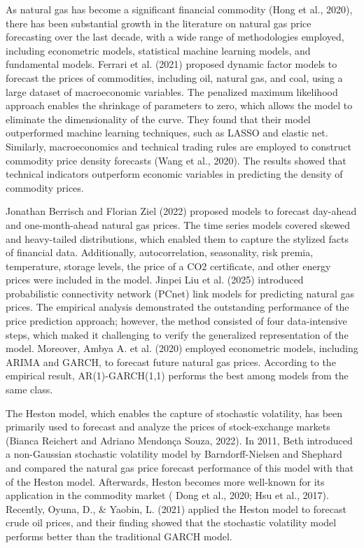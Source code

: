 \documentclass[12pt,a4paper]{article}
\numberwithin{equation}{section}
\begin{document}
As natural gas has become a significant financial commodity (Hong et al., 2020), there has been substantial growth in the literature on natural gas price forecasting over the last decade, with a wide range of methodologies employed, including econometric models, statistical machine learning models, and fundamental models. Ferrari et al. (2021) proposed dynamic factor models to forecast the prices of commodities, including oil, natural gas, and coal, using a large dataset of macroeconomic variables. The penalized maximum likelihood approach enables the shrinkage of parameters to zero, which allows the model to eliminate the dimensionality of the curve. They found that their model outperformed machine learning techniques, such as LASSO and elastic net. Similarly, macroeconomics and technical trading rules are employed to construct commodity price density forecasts (Wang et al., 2020). The results showed that technical indicators outperform economic variables in predicting the density of commodity prices. 

Jonathan Berrisch and Florian Ziel (2022) proposed models to forecast day-ahead and one-month-ahead natural gas prices. The time series models covered skewed and heavy-tailed distributions, which enabled them to capture the stylized facts of financial data. Additionally, autocorrelation, seasonality, risk premia, temperature, storage levels, the price of a CO2 certificate, and other energy prices were included in the model. Jinpei Liu et al. (2025) introduced probabilistic connectivity network (PCnet) link models for predicting natural gas prices. The empirical analysis demonstrated the outstanding performance of the price prediction approach; however, the method consisted of four data-intensive steps, which maked it challenging to verify the generalized representation of the model. Moreover, Ambya A. et al. (2020) employed econometric models, including ARIMA and GARCH, to forecast future natural gas prices. According to the empirical result, AR(1)-GARCH(1,1) performs the best among models from the same class.

The Heston model, which enables the capture of stochastic volatility, has been primarily used to forecast and analyze the prices of stock-exchange markets (Bianca Reichert and Adriano Mendonça Souza, 2022). In 2011, Beth introduced a non-Gaussian stochastic volatility model by Barndorff-Nielsen and Shephard and compared the natural gas price forecast performance of this model with that of the Heston model. Afterwards, Heston becomes more well-known for its application in the commodity market ( Dong et al., 2020; Hsu et al., 2017). Recently, Oyuna, D., \& Yaobin, L. (2021) applied the Heston model to forecast crude oil prices, and their finding showed that the stochastic volatility model performs better than the traditional GARCH model.
\end{document}
